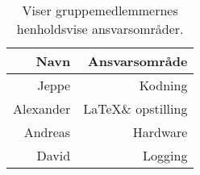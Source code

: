 \begin{table}
    \centering
    \begin{tabular}{r|r}
        \hline
        Navn       & Ansvarsområde              \\ \hline \hline
        Jeppe      & Kodning                    \\ \hline
        Alexander  & \LaTeX \space\& opstilling \\ \hline
        Andreas    & Hardware                   \\ \hline
        David      & Logging                    \\ \hline
    \end{tabular}
    \caption{Viser gruppemedlemmernes henholdsvise ansvarsområder.}
    \label{sec_2:tab:ansvarsområde}
\end{table}